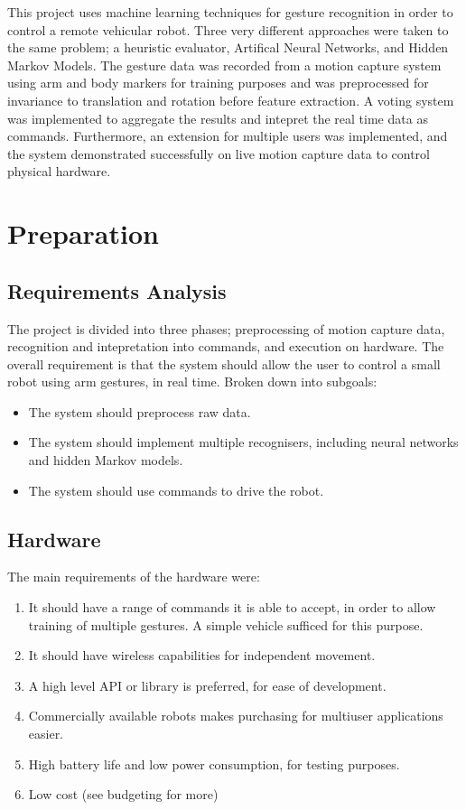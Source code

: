 \documentclass[12pt,a4,notitlepage]{report}
\renewcommand{\_}{\texttt{\symbol{95}}}
\newcommand{\<}{\texttt{\symbol{60}}}
\renewcommand{\>}{\texttt{\symbol{62}}}
\begin{document}
This project uses machine learning techniques for gesture recognition in order to control a remote vehicular robot. Three very different approaches were taken to the same problem; a heuristic evaluator, Artifical Neural Networks, and Hidden Markov Models. The gesture data was recorded from a motion capture system using arm and body markers for training purposes and was preprocessed for invariance to translation and rotation before feature extraction. A voting system was implemented to aggregate the results and intepret the real time data as commands. Furthermore, an extension for multiple users was implemented, and the system demonstrated successfully on live motion capture data to control physical hardware.

\chapter{Preparation}

\section{Requirements Analysis}

The project is divided into three phases; preprocessing of motion capture data, recognition and intepretation into commands, and execution on hardware. The overall requirement is that the system should allow the user to control a small robot using arm gestures, in real time. Broken down into subgoals:

\begin{itemize}
\item The system should preprocess raw data.
\item The system should implement multiple recognisers, including neural networks and hidden Markov models.
\item The system should use commands to drive the robot.
\end{itemize}

\section{Hardware}

The main requirements of the hardware were:

\begin{enumerate}
\item It should  have a range of commands it is able to accept, in order to allow training of multiple gestures. A simple vehicle sufficed for this purpose.
\item It should have wireless capabilities for independent movement.
\item A high level API or library is preferred, for ease of development.
\item Commercially available robots makes purchasing for multiuser applications easier.
\item High battery life and low power consumption, for testing purposes.
\item Low cost (see budgeting for more)
\end{enumerate}
\end{document}
